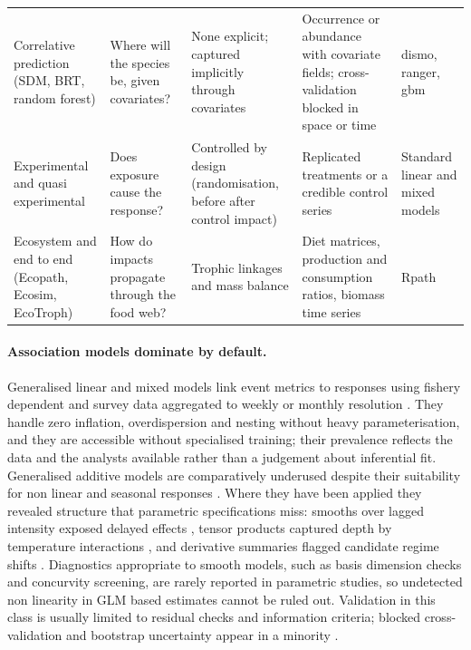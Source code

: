 \begin{table}[H]
\begin{tabular}{p{2.5cm}p{3.3cm}p{3.0cm}p{3.2cm}p{2.6cm}}
\addlinespace
Correlative prediction (SDM, BRT, random forest) & Where will the species be, given covariates? & None explicit; captured implicitly through covariates & Occurrence or abundance with covariate fields; cross-validation blocked in space or time & dismo, ranger, gbm \\
\addlinespace
Experimental and quasi experimental & Does exposure cause the response? & Controlled by design (randomisation, before after control impact) & Replicated treatments or a credible control series & Standard linear and mixed models \\
\addlinespace
Ecosystem and end to end (Ecopath, Ecosim, EcoTroph) & How do impacts propagate through the food web? & Trophic linkages and mass balance & Diet matrices, production and consumption ratios, biomass time series & Rpath \\
\bottomrule
\end{tabular}
\end{table}

\paragraph{Association models dominate by default.}
Generalised linear and mixed models link event metrics to responses using fishery dependent and survey data aggregated to weekly or monthly resolution \citep{brown2021,caputi2016,hart2018,mann2021}. They handle zero inflation, overdispersion and nesting without heavy parameterisation, and they are accessible without specialised training; their prevalence reflects the data and the analysts available rather than a judgement about inferential fit. Generalised additive models are comparatively underused despite their suitability for non linear and seasonal responses \citep{becker2019,fredston2023}. Where they have been applied they revealed structure that parametric specifications miss: smooths over lagged intensity exposed delayed effects \citep{abookire2022,blixt2025}, tensor products captured depth by temperature interactions \citep{becker2019}, and derivative summaries flagged candidate regime shifts \citep{blixt2025}. Diagnostics appropriate to smooth models, such as basis dimension checks and concurvity screening, are rarely reported in parametric studies, so undetected non linearity in GLM based estimates cannot be ruled out. Validation in this class is usually limited to residual checks and information criteria; blocked cross-validation and bootstrap uncertainty appear in a minority \citep{benedetticecchi2024,brown2021,gomes2023}.

